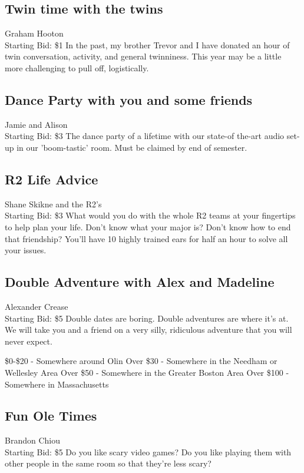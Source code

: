 \documentclass[11pt]{article}
\begin{document}
\subsection{Twin time with the twins}
Graham Hooton
\\
Starting Bid: \$1
\newline
In the past, my brother Trevor and I have donated an hour of twin conversation, activity, and general twinniness. This year may be a little more challenging to pull off, logistically.
\subsection{Dance Party  with you and some friends}
Jamie and Alison
\\
Starting Bid: \$3
\newline
The dance party of a lifetime with our state-of the-art audio set-up in our 'boom-tastic' room. Must be claimed by end of semester.
\subsection{R2 Life Advice}
Shane Skikne and the R2's
\\
Starting Bid: \$3
\newline
What would you do with the whole R2 teams at your fingertips to help plan your life. Don't know what your major is? Don't know how to end that friendship? You'll have 10 highly trained ears for half an hour to solve all your issues.
\subsection{Double Adventure with Alex and Madeline}
Alexander Crease
\\
Starting Bid: \$5
\newline
Double dates are boring. Double adventures are where it's at. We will take you and a friend on a very silly, ridiculous adventure that you will never expect. 

\$0-\$20 - Somewhere around Olin
Over \$30 - Somewhere in the Needham or Wellesley Area
Over \$50 - Somewhere in the Greater Boston Area
Over \$100 - Somewhere in Massachusetts
\subsection{Fun Ole Times}
Brandon Chiou
\\
Starting Bid: \$5
\newline
Do you like scary video games? Do you like playing them with other people in the same room so that they're less scary?
\end{document}
